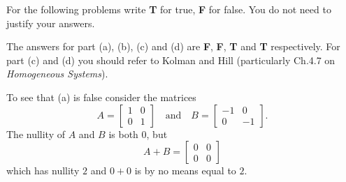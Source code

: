 \begin{questions}
  \question For the following problems write \textbf{T} for true,
  \textbf{F} for false. You do not need to justify your answers.
  \begin{solution}
    The answers for part (a), (b), (c) and (d) are \textbf{F}, \textbf{F},
    \textbf{T} and \textbf{T} respectively. For part (c) and (d) you should
    refer to Kolman and Hill (particularly Ch.\@ 4.7 on \emph{Homogeneous
      Systems}).

    To see that (a) is false consider the matrices
    \[
      A=\begin{bmatrix}
        1&0\\0&1
      \end{bmatrix}\quad\text{and}\quad
      B=\begin{bmatrix}
        -1&0\\0&-1
      \end{bmatrix}.
    \]
    The nullity of $A$ and $B$ is both $0$, but
    \[
      A+B=\begin{bmatrix}0&0\\0&0\end{bmatrix}
    \]
    which has nullity $2$ and $0+0$ is by no means equal to $2$.


\end{solution}
\end{questions}
